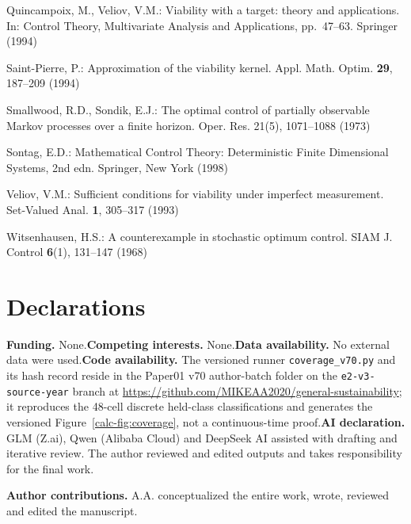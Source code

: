 \documentclass[10pt,twocolumn]{article}
\theoremstyle{definition}
\begin{document}
{Quincampoix, M., Veliov, V.M.: Viability with a target: theory and
applications. In: Control Theory, Multivariate Analysis and
Applications, pp.~47--63. Springer (1994)

Saint-Pierre, P.: Approximation of the viability kernel. Appl. Math.
Optim. \textbf{29}, 187--209 (1994)

Smallwood, R.D., Sondik, E.J.: The optimal control of partially
observable Markov processes over a finite horizon. Oper. Res. 21(5),
1071--1088 (1973)

Sontag, E.D.: Mathematical Control Theory: Deterministic Finite Dimensional Systems, 2nd edn. Springer, New York (1998)

Veliov, V.M.: Sufficient conditions for viability under imperfect
measurement. Set-Valued Anal. \textbf{1}, 305--317 (1993)

Witsenhausen, H.S.: A counterexample in stochastic optimum control.
SIAM J. Control \textbf{6}(1), 131--147 (1968)
}

\section*{Declarations}

\textbf{Funding.} None.\quad \textbf{Competing interests.} None.\quad \textbf{Data availability.} No external data were used.\quad \textbf{Code availability.} The versioned runner \texttt{coverage\_v70.py} and its hash record reside in the Paper01 v70 author-batch folder on the \texttt{e2-v3-source-year} branch at \url{https://github.com/MIKEAA2020/general-sustainability}; it reproduces the 48-cell discrete held-class classifications and generates the versioned Figure~\ref{calc-fig:coverage}, not a continuous-time proof.\quad \textbf{AI declaration.} GLM (Z.ai), Qwen (Alibaba Cloud) and DeepSeek AI assisted with drafting and iterative review. The author reviewed and edited outputs and takes
responsibility for the final work.

\textbf{Author contributions.} A.A. conceptualized the entire work, wrote, reviewed and edited the manuscript.
\end{document}
